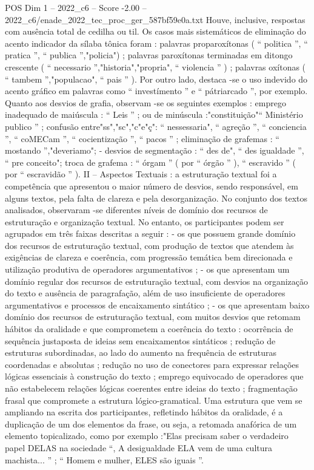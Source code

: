 \begin{textsample}{POS Dim 1 – 2022\_c6 – Score -2.00 – 2022\_c6/enade\_2022\_tec\_proc\_ger\_587bf59e0a.txt}
Houve, inclusive, respostas com ausência total de cedilha ou til.
Os casos mais sistemáticos de eliminação do acento indicador da sílaba tônica foram : palavras proparoxítonas ( “ politica ”, “ pratica ”, “ publica ”,"policia") ; palavras paroxítonas terminadas em ditongo crescente ( “ necessario ”,"historia","propria", “ violencia ” ) ; palavras oxítonas ( “ tambem ”,"populacao", “ pais ” ).
Por outro lado, destaca -se o uso indevido do acento gráfico em palavras como “ investímento ” e “ pátriarcado ”, por exemplo.
Quanto aos desvios de grafia, observam -se os seguintes exemplos : emprego inadequado de maiúscula : “ Leis ” ; ou de minúscula :"constituição"“ Ministério publico ” ; confusão entre"ss","sc","c"e"ç": “ nessessaria", “ agreção ”, “ conciencia ”, “ coMECam ”, “ cocientização ”, “ pacos ” ; eliminação de grafemas : “ mostando ”,"deveriamo"; - desvios de segmentação : “ des de", “ des igualdade ”, “ pre conceito"; troca de grafema : “ órgam ” ( por “ órgão ” ), “ escravido ” ( por “ escravidão ” ).
II – Aspectos Textuais : a estruturação textual foi a competência que apresentou o maior número de desvios, sendo responsável, em alguns textos, pela falta de clareza e pela desorganização.
No conjunto dos textos analisados, observaram -se diferentes níveis de domínio dos recursos de estruturação e organização textual.
No entanto, os participantes podem ser agrupados em três faixas descritas a seguir : - os que possuem grande domínio dos recursos de estruturação textual, com produção de textos que atendem às exigências de clareza e coerência, com progressão temática bem direcionada e utilização produtiva de operadores argumentativos ; - os que apresentam um domínio regular dos recursos de estruturação textual, com desvios na organização do texto e ausência de paragrafação, além de uso insuficiente de operadores argumentativos e processos de encaixamento sintático ; - os que apresentam baixo domínio dos recursos de estruturação textual, com muitos desvios que retomam hábitos da oralidade e que comprometem a coerência do texto : ocorrência de sequência justaposta de ideias sem encaixamentos sintáticos ; redução de estruturas subordinadas, ao lado do aumento na frequência de estruturas coordenadas e absolutas ; redução no uso de conectores para expressar relações lógicas essenciais à construção do texto ; emprego equivocado de operadores que não estabelecem relações lógicas coerentes entre ideias do texto ; fragmentação frasal que compromete a estrutura lógico-gramatical.
Uma estrutura que vem se ampliando na escrita dos participantes, refletindo hábitos da oralidade, é a duplicação de um dos elementos da frase, ou seja, a retomada anafórica de um elemento topicalizado, como por exemplo :"Elas precisam saber o verdadeiro papel DELAS na sociedade “, A desigualdade ELA vem de uma cultura machista... ” ; “ Homem e mulher, ELES são iguais ”.

\end{textsample}
